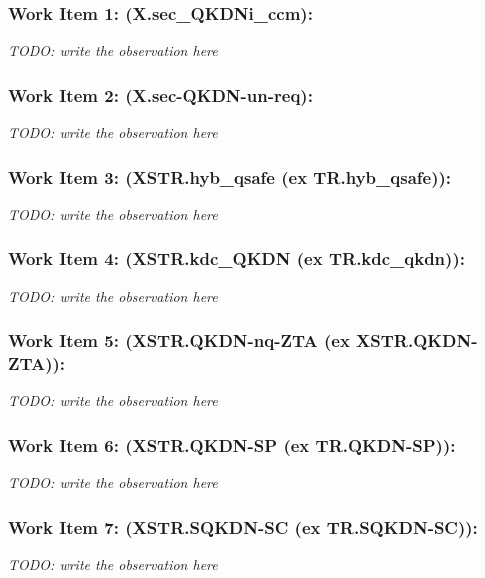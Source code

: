 \subsubsection{Work Item 1: (X.sec_QKDNi_ccm):}

\textit{TODO: write the observation here}

\subsubsection{Work Item 2: (X.sec-QKDN-un-req):}

\textit{TODO: write the observation here}

\subsubsection{Work Item 3: (XSTR.hyb_qsafe (ex TR.hyb_qsafe)):}

\textit{TODO: write the observation here}

\subsubsection{Work Item 4: (XSTR.kdc_QKDN (ex TR.kdc_qkdn)):}

\textit{TODO: write the observation here}

\subsubsection{Work Item 5: (XSTR.QKDN-nq-ZTA (ex XSTR.QKDN-ZTA)):}

\textit{TODO: write the observation here}

\subsubsection{Work Item 6: (XSTR.QKDN-SP (ex TR.QKDN-SP)):}

\textit{TODO: write the observation here}

\subsubsection{Work Item 7: (XSTR.SQKDN-SC (ex TR.SQKDN-SC)):}

\textit{TODO: write the observation here}
